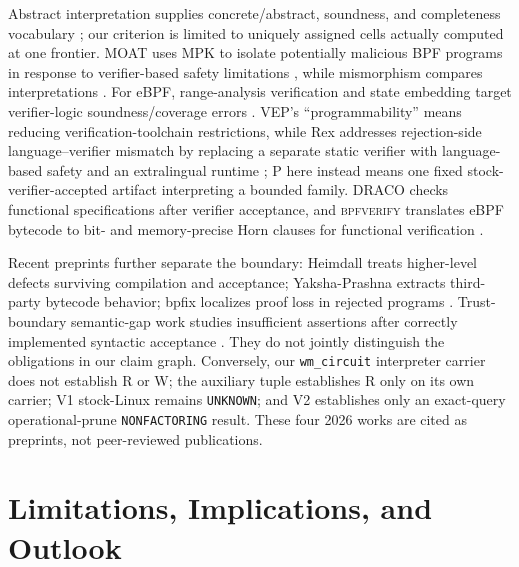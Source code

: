 \documentclass[conference]{IEEEtran}
\begin{document}
Abstract interpretation supplies concrete/abstract, soundness, and completeness vocabulary \cite{ref5,ref17}; our criterion is limited to uniquely assigned cells actually computed at one frontier. MOAT uses MPK to isolate potentially malicious BPF programs in response to verifier-based safety limitations \cite{ref20}, while mismorphism compares interpretations \cite{ref21}. For eBPF, range-analysis verification and state embedding target verifier-logic soundness/coverage errors \cite{ref29,ref30}. VEP's ``programmability'' means reducing verification-toolchain restrictions, while Rex addresses rejection-side language--verifier mismatch by replacing a separate static verifier with language-based safety and an extralingual runtime \cite{ref31,ref37}; P here instead means one fixed stock-verifier-accepted artifact interpreting a bounded family. DRACO checks functional specifications after verifier acceptance, and \textsc{bpfverify} translates eBPF bytecode to bit- and memory-precise Horn clauses for functional verification \cite{ref32,ref38}.

Recent preprints further separate the boundary: Heimdall treats higher-level defects surviving compilation and acceptance; Yaksha-Prashna extracts third-party bytecode behavior; bpfix localizes proof loss in rejected programs \cite{ref33,ref34,ref35}. Trust-boundary semantic-gap work studies insufficient assertions after correctly implemented syntactic acceptance \cite{ref36}. They do not jointly distinguish the obligations in our claim graph. Conversely, our \texttt{wm\_circuit} interpreter carrier does not establish R or W; the auxiliary tuple establishes R only on its own carrier; V1 stock-Linux remains \texttt{UNKNOWN}; and V2 establishes only an exact-query operational-prune \texttt{NONFACTORING} result. These four 2026 works are cited as preprints, not peer-reviewed publications.

\section{Limitations, Implications, and Outlook}
\end{document}
